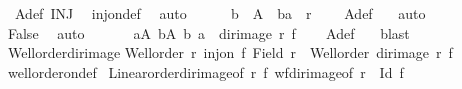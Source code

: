 \begin{isabellebody}
\ {}\ A{\isacharunderscore}{\kern0pt}def\ INJ\ \isamarkupfalse%
\ inj{\isacharunderscore}{\kern0pt}on{\isacharunderscore}{\kern0pt}def\ \isamarkupfalse%
\ auto\isanewline
\ \ \ \ \isamarkupfalse%
\ {\isachardoublequoteopen}b{}\ {\isasymin}\ A\ {\isasymand}\ {\isacharparenleft}{\kern0pt}b{}{\isacharcomma}{\kern0pt}a{\isacharparenright}{\kern0pt}\ {\isasymin}\ r{\isachardoublequoteclose}\ \isamarkupfalse%
\ {}\ {}\ A{\isacharunderscore}{\kern0pt}def\ {\isacharasterisk}{\kern0pt}\ \isamarkupfalse%
\ auto\isanewline
\ \ \ \ \isamarkupfalse%
\ {}\ \isamarkupfalse%
\ False\ \isamarkupfalse%
\ auto\isanewline
\ \ \isamarkupfalse%
\isanewline
\ \ \isamarkupfalse%
\ {\isachardoublequoteopen}{\isasymexists}a{\isacharprime}{\kern0pt}{\isasymin}A{\isacharprime}{\kern0pt}{\isachardot}{\kern0pt}\ {\isasymforall}b{\isacharprime}{\kern0pt}{\isasymin}A{\isacharprime}{\kern0pt}{\isachardot}{\kern0pt}\ {\isacharparenleft}{\kern0pt}b{\isacharprime}{\kern0pt}{\isacharcomma}{\kern0pt}\ a{\isacharprime}{\kern0pt}{\isacharparenright}{\kern0pt}\ {\isasymnotin}\ dir{\isacharunderscore}{\kern0pt}image\ r\ f{\isachardoublequoteclose}\isanewline
\ \ \isamarkupfalse%
\ A{\isacharunderscore}{\kern0pt}def\ {}\ \isamarkupfalse%
\ blast\isanewline
{}\isamarkupfalse%
%
\endisatagproof
{\isafoldproof}%
%
\isadelimproof
\isanewline
%
\endisadelimproof
\isanewline
{}\isamarkupfalse%
\ Well{\isacharunderscore}{\kern0pt}order{\isacharunderscore}{\kern0pt}dir{\isacharunderscore}{\kern0pt}image{\isacharcolon}{\kern0pt}\isanewline
{\isachardoublequoteopen}{\isasymlbrakk}Well{\isacharunderscore}{\kern0pt}order\ r{\isacharsemicolon}{\kern0pt}\ inj{\isacharunderscore}{\kern0pt}on\ f\ {\isacharparenleft}{\kern0pt}Field\ r{\isacharparenright}{\kern0pt}{\isasymrbrakk}\ {\isasymLongrightarrow}\ Well{\isacharunderscore}{\kern0pt}order\ {\isacharparenleft}{\kern0pt}dir{\isacharunderscore}{\kern0pt}image\ r\ f{\isacharparenright}{\kern0pt}{\isachardoublequoteclose}\isanewline
%
\isadelimproof
%
\endisadelimproof
%
\isatagproof
{}\isamarkupfalse%
\ well{\isacharunderscore}{\kern0pt}order{\isacharunderscore}{\kern0pt}on{\isacharunderscore}{\kern0pt}def\isanewline
{}\isamarkupfalse%
\ Linear{\isacharunderscore}{\kern0pt}order{\isacharunderscore}{\kern0pt}dir{\isacharunderscore}{\kern0pt}image{\isacharbrackleft}{\kern0pt}of\ r\ f{\isacharbrackright}{\kern0pt}\ wf{\isacharunderscore}{\kern0pt}dir{\isacharunderscore}{\kern0pt}image{\isacharbrackleft}{\kern0pt}of\ {\isachardoublequoteopen}r\ {\isacharminus}{\kern0pt}\ Id{\isachardoublequoteclose}\ f{\isacharbrackright}{\kern0pt}\isanewline

\end{isabellebody}
